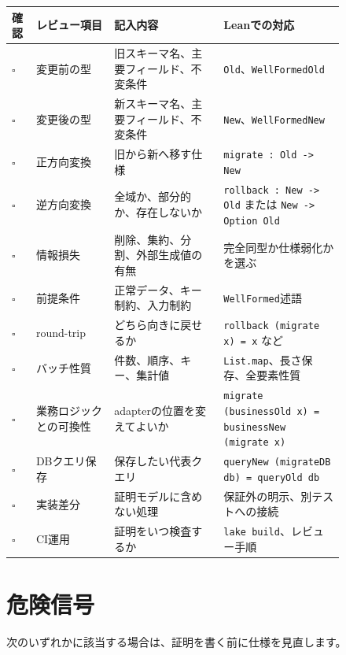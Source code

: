 \begin{longtable}{@{}p{0.045\linewidth}p{0.20\linewidth}p{0.28\linewidth}p{0.31\linewidth}@{}}
\toprule
確認 & レビュー項目 & 記入内容 & Leanでの対応 \\
\midrule
\endhead
\(\square\) & 変更前の型 & 旧スキーマ名、主要フィールド、不変条件 & \texttt{Old}、\texttt{WellFormedOld} \\
\(\square\) & 変更後の型 & 新スキーマ名、主要フィールド、不変条件 & \texttt{New}、\texttt{WellFormedNew} \\
\(\square\) & 正方向変換 & 旧から新へ移す仕様 & \texttt{migrate : Old -> New} \\
\(\square\) & 逆方向変換 & 全域か、部分的か、存在しないか & \texttt{rollback : New -> Old} または \texttt{New -> Option Old} \\
\(\square\) & 情報損失 & 削除、集約、分割、外部生成値の有無 & 完全同型か仕様弱化かを選ぶ \\
\(\square\) & 前提条件 & 正常データ、キー制約、入力制約 & \texttt{WellFormed}述語 \\
\(\square\) & round-trip & どちら向きに戻せるか & \texttt{rollback (migrate x) = x} など \\
\(\square\) & バッチ性質 & 件数、順序、キー、集計値 & \texttt{List.map}、長さ保存、全要素性質 \\
\(\square\) & 業務ロジックとの可換性 & adapterの位置を変えてよいか & \texttt{migrate (businessOld x) = businessNew (migrate x)} \\
\(\square\) & DBクエリ保存 & 保存したい代表クエリ & \texttt{queryNew (migrateDB db) = queryOld db} \\
\(\square\) & 実装差分 & 証明モデルに含めない処理 & 保証外の明示、別テストへの接続 \\
\(\square\) & CI運用 & 証明をいつ検査するか & \texttt{lake build}、レビュー手順 \\
\bottomrule
\end{longtable}

\section{危険信号}

次のいずれかに該当する場合は、証明を書く前に仕様を見直します。

